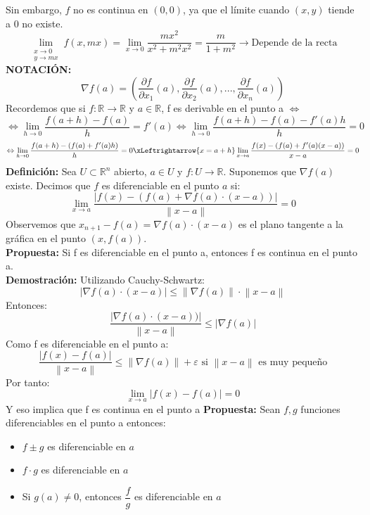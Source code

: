 \documentclass[11pt]{article}
\providecommand{\norm}[1]{\left\lVert #1 \right \rVert}
\providecommand{\abs}[1]{\left\lvert #1\right\rvert}
\providecommand{\norm}[1]{\left\lVert #1 \right \rVert}
\providecommand{\abs}[1]{\left\lvert #1\right\rvert}
\newcommand{\R}{\mathbb{R}}
\theoremstyle{plain}
\begin{document}
            Sin embargo, $f$ no es continua en $(0,0)$, ya que el límite cuando $(x,y)$ tiende a 0 no existe.
            \[\lim_{\substack{x \to 0 \\ y \to mx}} f(x,mx) = \lim_{x \to 0} \frac{mx^2}{x^2 + m^2x^2} = \frac{m}{1 + m^2} \rightarrow \text{Depende de la recta}\]
        \textbf{NOTACIÓN:}
        \begin{equation}
            \nabla f(a) = \left( \frac{\partial f}{\partial x_1}(a), \frac{\partial f}{\partial x_2}(a), ... , \frac{\partial f}{\partial x_n}(a)\right) 
        \end{equation}
        Recordemos que si $f:\R \rightarrow \R$ y $a\in \R$, f es derivable en el punto a $\Leftrightarrow$
        \[\Leftrightarrow \lim_{h \to 0} \frac{f(a+h) - f(a)}{h} = f'(a) \Leftrightarrow \lim_{h \to 0} \frac{f(a+h) - f(a) - f'(a)h}{h} = 0\]
        \[\Leftrightarrow \lim_{h\to 0} \frac{f(a+h) - (f(a)+f'(a)h)}{h} = 0 \xLeftrightarrow{x=a+h} \lim_{x\to a} \frac{f(x) - (f(a)+ f'(a)(x-a))}{x-a} = 0\]
        \textbf{Definición:} Sea $U \subset \R^n$ abierto, $a \in U$ y $f:U\rightarrow \R$. Suponemos que $\nabla f(a)$ existe. Decimos que $f$ es diferenciable en el punto $a$ si:
        \begin{equation}
            \lim_{x \to a} \frac{\abs{f(x) - (f(a) + \nabla f(a)\cdot (x-a))}}{\norm{x-a}} = 0
        \end{equation}
        Observemos que $x_{n+1} - f(a) = \nabla f(a)\cdot(x-a)$ es el plano tangente a la gráfica en el punto $(x,f(a))$.\\
        \textbf{Propuesta:} Si f es diferenciable en el punto a, entonces f es continua en el punto a.\\
        \textbf{Demostración:}
            Utilizando Cauchy-Schwartz:
            \[\abs{\nabla f(a) \cdot (x-a)} \le \norm{\nabla f(a)} \cdot \norm{x-a}\]
            Entonces:
            \[\frac{\abs{\nabla f(a)\cdot (x-a))}}{\norm{x-a}} \le \abs{\nabla f(a)}\]
            Como f es diferenciable en el punto a:
            \[\frac{\abs{f(x)-f(a)}}{\norm{x-a}} \le \norm{\nabla f(a)} + \varepsilon \text{ si } \norm{x-a} \text{ es muy pequeño}\]
            Por tanto:
            \[\lim_{x \to a} \abs{f(x)-f(a)} = 0\]
            Y eso implica que f es continua en el punto a
        \textbf{Propuesta:} Sean $f,g$ funciones diferenciables en el punto a entonces:
        \begin{itemize}
            \item $f\pm g$ es diferenciable en $a$
            \item $f \cdot g$ es diferenciable en $a$
            \item Si $g(a)\ne 0$, entonces $\dfrac{f}{g}$ es diferenciable en $a$ 
        \end{itemize}
\end{document}
